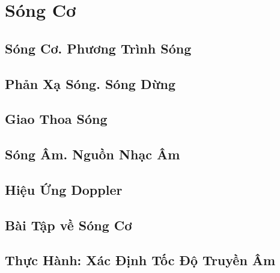 \documentclass{article}
\numberwithin{equation}{section}
\begin{document}

\section{Sóng Cơ}

\subsection{Sóng Cơ. Phương Trình Sóng}


\subsection{Phản Xạ Sóng. Sóng Dừng}


\subsection{Giao Thoa Sóng}


\subsection{Sóng Âm. Nguồn Nhạc Âm}


\subsection{Hiệu Ứng Doppler}


\subsection{Bài Tập về Sóng Cơ}


\subsection{Thực Hành: Xác Định Tốc Độ Truyền Âm}
\end{document}
